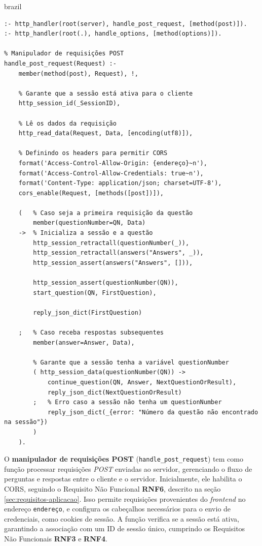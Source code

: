 \begin{otherlanguage*}{brazil}
\begin{lstlisting}[style=ufscthesisx_style, caption={Arquivo \textit{server.pl} - \textit{Handlers} e Manipuladores de requisições}]
% Define o handler para receber as requisições HTTP POST
:- http_handler(root(server), handle_post_request, [method(post)]).
:- http_handler(root(.), handle_options, [method(options)]).

% Manipulador de requisições POST
handle_post_request(Request) :-
    member(method(post), Request), !,
    
    % Garante que a sessão está ativa para o cliente
    http_session_id(_SessionID),

    % Lê os dados da requisição
    http_read_data(Request, Data, [encoding(utf8)]),

    % Definindo os headers para permitir CORS
    format('Access-Control-Allow-Origin: {endereço}~n'),
    format('Access-Control-Allow-Credentials: true~n'),
    format('Content-Type: application/json; charset=UTF-8'),
    cors_enable(Request, [methods([post])]),

    (   % Caso seja a primeira requisição da questão
        member(questionNumber=QN, Data) 
    ->  % Inicializa a sessão e a questão
        http_session_retractall(questionNumber(_)),
        http_session_retractall(answers("Answers", _)),
        http_session_assert(answers("Answers", [])),
        
        http_session_assert(questionNumber(QN)),
        start_question(QN, FirstQuestion),

        reply_json_dict(FirstQuestion)

    ;   % Caso receba respostas subsequentes
        member(answer=Answer, Data),
        
        % Garante que a sessão tenha a variável questionNumber
        ( http_session_data(questionNumber(QN)) ->
            continue_question(QN, Answer, NextQuestionOrResult),
            reply_json_dict(NextQuestionOrResult)
        ;   % Erro caso a sessão não tenha um questionNumber
            reply_json_dict(_{error: "Número da questão não encontrado na sessão"})
        )
    ).
\end{lstlisting}    

O \textbf{manipulador de requisições POST} (\texttt{handle\_post\_request}) tem como função processar requisições \textit{POST} enviadas ao servidor, gerenciando o fluxo de perguntas e respostas entre o cliente e o servidor. Inicialmente, ele habilita o CORS, seguindo o Requisito Não Funcional \textbf{RNF6}, descrito na seção \ref{sec:requisitos-aplicacao}. Isso permite requisições provenientes do \textit{frontend} no endereço \texttt{endereço}, e configura os cabeçalhos necessários para o envio de credenciais, como cookies de sessão. A função verifica se a sessão está ativa, garantindo a associação com um ID de sessão único, cumprindo os Requisitos Não Funcionais \textbf{RNF3} e \textbf{RNF4}.


\end{otherlanguage*}
